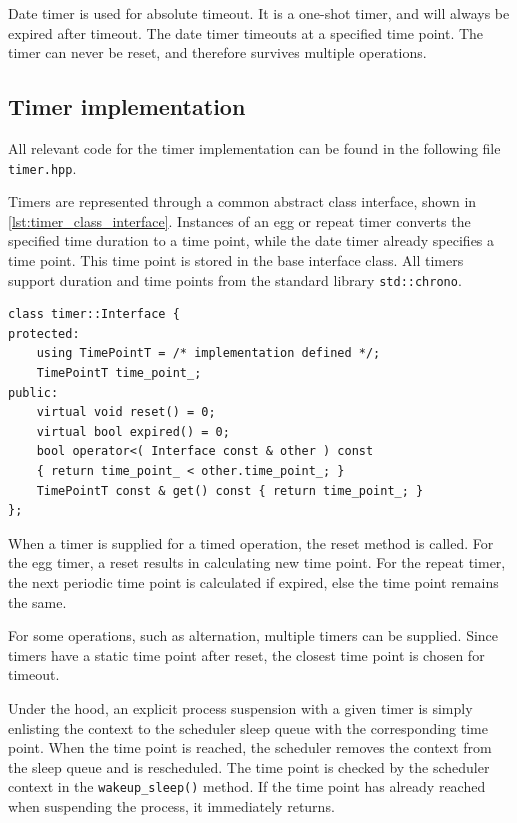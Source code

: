 Date timer is used for absolute timeout. It is a one\hyp{}shot timer, and will always be expired after timeout. The date timer timeouts at a specified time point. The timer can never be reset, and therefore survives multiple operations.


\FloatBarrier
\subsection{Timer implementation}
\label{subsec:timer_implementation}

All relevant code for the timer implementation can be found in the following file \texttt{timer.hpp}.

Timers are represented through a common abstract class interface, shown in \cref{lst:timer_class_interface}. Instances of an egg or repeat timer converts the specified time duration to a time point, while the date timer already specifies a time point. This time point is stored in the base interface class. All timers support duration and time points from the standard library \texttt{std::chrono}.

\begin{lstfloat}
\begin{lstlisting}[caption={Timer class interface.}, label={lst:timer_class_interface}, style={CustomC++}, xleftmargin={4em}]
class timer::Interface {
protected:
    using TimePointT = /* implementation defined */;
    TimePointT time_point_;
public:
    virtual void reset() = 0;
    virtual bool expired() = 0;
    bool operator<( Interface const & other ) const 
    { return time_point_ < other.time_point_; }
    TimePointT const & get() const { return time_point_; }
};
\end{lstlisting}
\end{lstfloat}

When a timer is supplied for a timed operation, the reset method is called. For the egg timer, a reset results in calculating new time point. For the repeat timer, the next periodic time point is calculated if expired, else the time point remains the same.

For some operations, such as alternation, multiple timers can be supplied. Since timers have a static time point after reset, the closest time point is chosen for timeout.

Under the hood, an explicit process suspension with a given timer is simply enlisting the context to the scheduler sleep queue with the corresponding time point. When the time point is reached, the scheduler removes the context from the sleep queue and is rescheduled. The time point is checked by the scheduler context in the \texttt{wakeup\_sleep()} method. If the time point has already reached when suspending the process, it immediately returns. 

